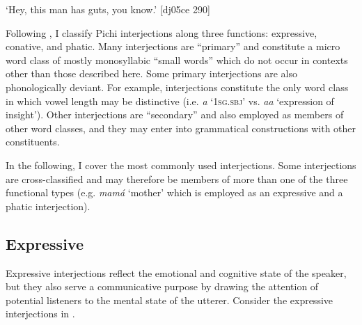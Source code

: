 \glt ‘Hey, this man has guts, you know.’ [dj05ce 290]
\z

Following \citet{Ameka1992b,Ameka1992a}, I classify Pichi interjections along three functions: expressive, conative, and phatic. Many interjections are “primary” \citep{Ameka1992a} and constitute a micro word class of mostly monosyllabic “small words” which do not occur in contexts other than those described here. Some primary interjections are also phonologically deviant. For example, interjections constitute the only word class in which vowel length may be distinctive (i.e. \textit{a} ‘\textsc{1sg.sbj}’ vs. \textit{aa} ‘expression of insight’). Other interjections are “secondary” and also employed as members of other word classes, and they may enter into grammatical constructions with other constituents. 


In the following, I cover the most commonly used interjections. Some interjections are cross-classified and may therefore be members of more than one of the three functional types (e.g. \textit{mamá} ‘mother’ which is employed as an expressive and a phatic interjection). 


\subsection{Expressive}

Expressive interjections reflect the emotional and cognitive state of the speaker, but they also serve a communicative purpose by drawing the attention of potential listeners to the mental state of the utterer. Consider the expressive interjections in .

